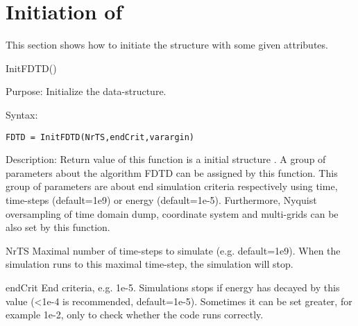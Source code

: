 \section{Initiation of } \label{sec:FDTD_ATTRIBUTE}
 \label{para:FDTD_ATTRIBUTE}
This section shows how to initiate the structure  with some given attributes.
 
\begin{FontNameFunct}{InitFDTD()}
 \label{func:InitFDTD} 
\end{FontNameFunct}

\begin{FontDescr}{Purpose:}
Initialize the  data-structure.
\end{FontDescr}

\begin{FontDescr}{Syntax:}
      \begin{lstlisting}
FDTD = InitFDTD(NrTS,endCrit,varargin)
      \end{lstlisting}
\end{FontDescr}

\begin{FontDescr}{Description:}
Return value of this function is a initial structure  . A group of parameters about the algorithm FDTD can be assigned by this function. This group of parameters are about end  simulation criteria respectively  using time, time-steps (default=1e9) or energy (default=1e-5). Furthermore, Nyquist oversampling of time domain dump, coordinate system and multi-grids \cite{EC_FDTD_CYL_THORSTEN} can be also set by this function.
    \begin{FontPara}{NrTS}  \label{para:NrTS}
    Maximal number of time-steps to simulate (e.g. default=1e9). When the simulation runs to this maximal time-step, the simulation will stop.
    \end{FontPara}
    \begin{FontPara}{endCrit}  \label{para:endCrit}
    End criteria, e.g. 1e-5. Simulations stops if energy has decayed by this value (<1e-4 is recommended, default=1e-5). Sometimes it can be set greater, for example 1e-2, only to check whether the code runs correctly.
    \end{FontPara}
\end{FontDescr}

